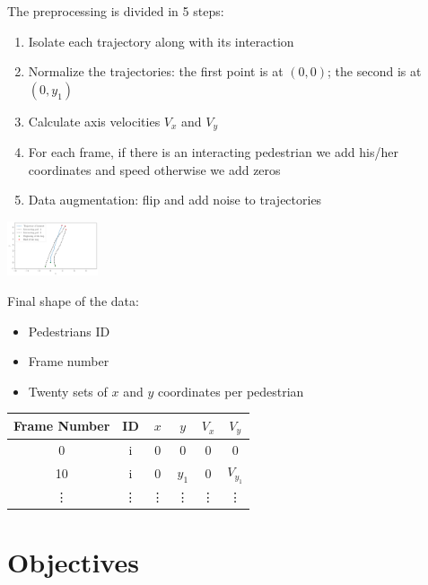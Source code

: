 \documentclass[a0,portrait]{a0poster}
\begin{document}
\begin{multicols}{2}
The preprocessing is divided in 5 steps:
\begin{enumerate}
\item Isolate each trajectory along with its interaction
\item Normalize the trajectories: the first point is at $(0,0)$; the second is at $(0,y_1)$
\item Calculate axis velocities $V_x$ and $V_y$
\item For each frame, if there is an interacting pedestrian we add his/her coordinates and speed otherwise we add zeros
\item Data augmentation: flip and add noise to trajectories
\end{enumerate}
\vspace{1cm}

\centerline {\includegraphics[width=0.2\textwidth]{figure/afterrot}}
\vspace{3cm}
Final shape of the data:\\
\begin{minipage}[]{0.5\linewidth}
\begin{itemize}
\item Pedestrians ID
\item Frame number 
\item Twenty sets of $x$ and $y$ coordinates per pedestrian
\end{itemize}
\end{minipage}
\hfill
\begin{minipage}[]{0.5\linewidth}
\begin{tabular}{|c|c|c|c|c|c|}
\hline
Frame Number & ID & $x$ & $y$ & $ V_x$ & $V_y$ \\ \hline
        0     &  i  &  0 &  0 &  0 &  0 \\ \hline
        10     &  i  &  0 &  $y_1$ &  0 &  $V_{y_1}$ \\ \hline
        \vdots     &  \vdots &  \vdots & \vdots &  \vdots &  \vdots \\ \hline
\end{tabular}
\end{minipage}

\section*{Objectives}


\end{multicols}
\end{document}
